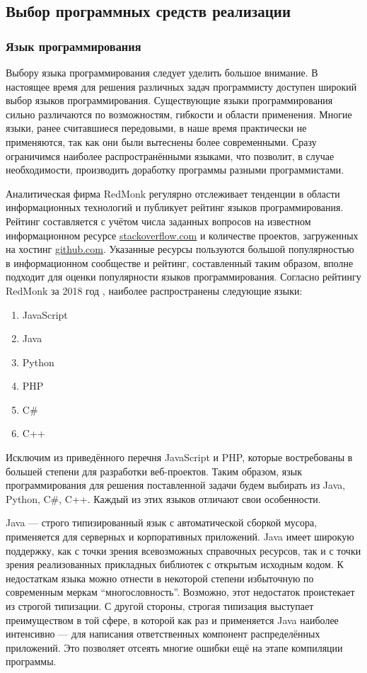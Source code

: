 \documentclass[12pt]{diploma}
\begin{document}
	\subsection{Выбор программных средств реализации}
	
	\subsubsection{Язык программирования} 
	Выбору языка программирования следует уделить большое внимание. В настоящее время для решения различных задач программисту доступен широкий выбор языков программирования. Существующие языки программирования
	сильно различаются по возможностям, гибкости и области применения. Многие языки, ранее считавшиеся передовыми, в наше время практически не применяются, так как они были вытеснены более современными. Сразу ограничимся наиболее распространёнными языками, что позволит, в случае необходимости, производить доработку программы разными программистами. 
	
	Аналитическая фирма RedMonk регулярно отслеживает тенденции в области информационных технологий и публикует рейтинг языков программирования. Рейтинг составляется с учётом числа заданных вопросов на известном информационном ресурсе \href{https://stackoverflow.com/}{stackoverflow.com} и количестве проектов, загруженных на хостинг \href{https://github.com/}{github.com}. Указанные ресурсы пользуются большой популярностью в информационном сообществе и рейтинг, составленный таким образом, вполне подходит для оценки популярности языков программирования. Согласно рейтингу RedMonk за 2018 год \cite{RedMonk}, наиболее распространены следующие языки:
	\begin{enumerate}
		\item JavaScript
		\item Java
		\item Python
		\item PHP
		\item C\#
		\item C++
	\end{enumerate}
	
	Исключим из приведённого перечня JavaScript и PHP, которые востребованы в большей степени для разработки веб-проектов. Таким образом, язык программирования для решения поставленной задачи будем выбирать из Java, Python, C\#, C++. Каждый из этих языков отличают свои особенности. 
	
	Java --- строго типизированный язык с автоматической сборкой мусора, применяется для серверных и корпоративных приложений. Java имеет широкую поддержку, как с точки зрения всевозможных справочных ресурсов, так и с точки зрения реализованных прикладных библиотек с открытым исходным кодом. К недостаткам языка можно отнести в некоторой степени избыточную по современным меркам ``многословность''. Возможно, этот недостаток проистекает из строгой типизации. С другой стороны, строгая типизация выступает преимуществом в той сфере, в которой как раз и применяется Java наиболее интенсивно --- для написания ответственных компонент распределённых приложений. Это позволяет отсеять многие ошибки ещё на этапе компиляции программы. 
	
\end{document}
